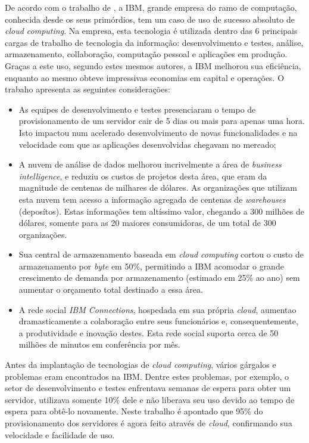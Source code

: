 De acordo com o trabalho de , a IBM, grande
empresa do ramo de computação, conhecida desde os seus primórdios, tem um caso
de uso de sucesso absoluto de \emph{cloud computing}. Na empresa, esta tecnologia
é utilizada dentro das 6 principais cargas de trabalho de tecnologia da informação:
desenvolvimento e testes, análise, armazenamento, collaboração, computação pessoal
e aplicações em produção. Graças a este uso, segundo estes mesmos autores, a
IBM melhorou sua eficiência, enquanto ao mesmo obteve impressivas economias em
capital e operações. O trabaho apresenta as seguintes considerações:

\begin{itemize}
    \item
        As equipes de desenvolvimento e testes presenciaram o tempo de provisionamento
        de um servidor cair de 5 dias ou mais para apenas uma hora. Isto impactou
        num acelerado desenvolvimento de novas funcionalidades e na velocidade
        com que as aplicações desenvolvidas chegavam no mercado;

    \item
        A nuvem de análise de dados melhorou incrivelmente a área de \emph{business intelligence},
        e reduziu os custos de projetos desta área, que eram da magnitude de centenas de milhares de dólares.
        As organizações que utilizam esta nuvem tem acesso a informação agregada de
        centenas de \emph{warehouses} (deposítos). Estas informações tem altíssimo valor, chegando
        a 300 milhões de dólares, somente para as 20 maiores consumidoras, de um total de 300 organizações.

    \item
        Sua central de armazenamento baseada em \emph{cloud computing} cortou
        o custo de armazenamento por \emph{byte} em 50\%, permitindo a IBM
        acomodar o grande crescimento de demanda por armazenamento (estimado
        em 25\% ao ano) sem aumentar o orçamento total destinado a essa área.

    \item
        A rede social \emph{IBM Connections}, hospedada em sua própria \emph{cloud},
        aumentao dramasticamente a colaboração entre seus funcionários e, consequentemente,
        a produtividade e inovação destes. Esta rede social suporta cerca de 50 milhões de minutos
        em conferência por mês.
\end{itemize}

Antes da implantação de tecnologias de \emph{cloud computing}, vários gárgalos
e problemas eram encontrados na IBM. Dentre estes problemas, por exemplo,
o setor de desenvolvimento e testes enfrentava semanas de espera para obter um
servidor, utilizava somente 10\% dele e não liberava seu uso devido ao tempo de
espera para obtê-lo novamente. Neste trabalho é apontado que 95\% do provisionamento
dos servidores é agora feito através de \emph{cloud}, confirmando sua velocidade e
facilidade de uso.

